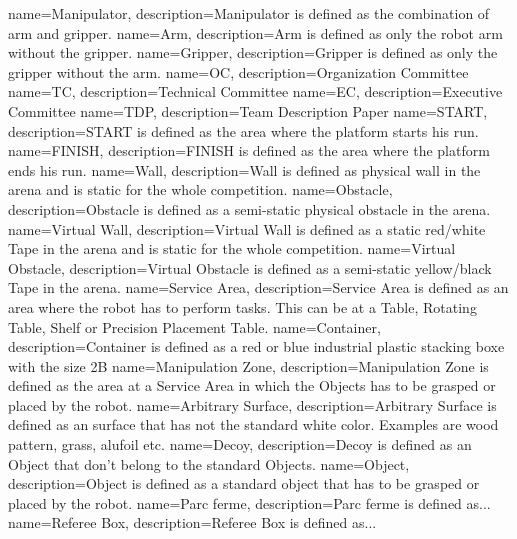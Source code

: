 {
	name=Manipulator,
	description={Manipulator is defined as the combination of arm and gripper.}
}
{
	name=Arm,
	description={Arm is defined as only the robot arm without the gripper.}
}
{
	name=Gripper,
	description={Gripper is defined as only the gripper without the arm.}
}
{
	name=OC,
	description={Organization Committee}
}
{
	name=TC,
	description={Technical Committee}
}
{
	name=EC,
	description={Executive Committee}
}
{
	name=TDP,
	description={Team Description Paper}
}
{
	name=START,
	description={START is defined as the area where the platform starts his run.}
}
{
	name=FINISH,
	description={FINISH is defined as the area where the platform ends his run.}
}
{
	name=Wall,
	description={Wall is defined as physical wall in the arena and is static for the whole competition.}
}
{
	name=Obstacle,
	description={Obstacle is defined as a semi-static physical obstacle in the arena.}
}
{
	name=Virtual Wall,
	description={Virtual Wall is defined as a static red/white Tape in the arena and is static for the whole competition.}
}
{
	name=Virtual Obstacle,
	description={Virtual Obstacle is defined as a semi-static yellow/black Tape in the arena.}
}
{
	name=Service Area,
	description={Service Area is defined as an area where the robot has to perform tasks. This can be at a Table, Rotating Table, Shelf or Precision Placement Table.}
}
{
	name=Container,
	description={Container is defined as a red or blue industrial plastic stacking boxe with the size 2B }
}
{
	name=Manipulation Zone,
	description={Manipulation Zone is defined as the area at a Service Area in which the Objects has to be grasped or placed by the robot.}
}
{
	name=Arbitrary Surface,
	description={Arbitrary Surface is defined as an surface that has not the standard white color. Examples are wood pattern, grass, alufoil etc.}
}
{
	name=Decoy,
	description={Decoy is defined as an Object that don't belong to the standard Objects.}
}
{
	name=Object,
	description={Object is defined as a standard object that has to be grasped or placed by the robot.}
}
{
	name=Parc ferme,
	description={Parc ferme is defined as...}
}
{
	name=Referee Box,
	description={Referee Box is defined as...}
}




